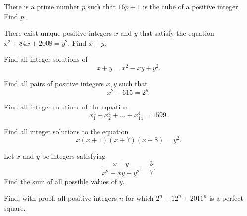 \documentclass{article}
\begin{document}
\begin{prob}[AIME I 2015/3]{4}

There is a prime number $p$ such that $16p+1$ is the cube of a positive integer. Find $p$.

\end{prob}

\begin{prob}[AIME I 2008/4]{4}

There exist unique positive integers $x$ and $y$ that satisfy the equation $x^2 + 84x + 2008 = y^2$. Find $x + y$.

\end{prob}

\begin{prob}[Moscow MO 1944]{6}
 
Find all integer solutions of 
$$x+y=x^2-xy+y^2.$$

\end{prob}

\begin{prob}[Italy MO 1995]{6}
 
Find all pairs of positive integers $x,y$ such that
$$x^2+615=2^y.$$

\end{prob}

\begin{prob}[USAMO 1979]{9}
 
Find all integer solutions of the equation
$$x_1^4 + x_2^4 + \ldots + x_{14}^4 = 1599.$$

\end{prob}

\begin{prob}{9}
 
Find all integer solutions to the equation
$$x(x+1)(x+7)(x+8) = y^2.$$

\end{prob}

\begin{prob}[Russia MO 1986]{9}

Let $x$ and $y$ be integers satisfying
$$\frac{x+y}{x^2-xy+y^2} = \frac{3}{7}.$$
Find the sum of all possible values of $y$.  

\end{prob}

\begin{prob}[USAJMO 2011/1]{13}

Find, with proof, all positive integers $n$ for which $2^n + 12^n + 2011^n$ is a perfect square.

\end{prob}
\end{document}
